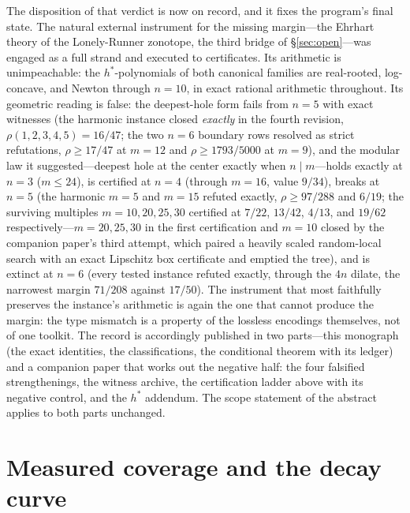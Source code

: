 \documentclass[11pt,a4paper]{article}
\numberwithin{equation}{section}
\theoremstyle{plain}
\theoremstyle{definition}
\theoremstyle{remark}
\begin{document}
The disposition of that verdict is now on record, and it fixes the
program's final state. The natural external instrument for the missing
margin---the Ehrhart theory of the Lonely-Runner zonotope, the third
bridge of \S\ref{sec:open}---was engaged as a full strand and executed
to certificates. Its arithmetic is unimpeachable: the $h^*$-polynomials
of both canonical families are real-rooted, log-concave, and Newton
through $n=10$, in exact rational arithmetic throughout. Its geometric
reading is false: the deepest-hole form fails from $n=5$ with exact
witnesses (the harmonic instance closed \emph{exactly} in the fourth
revision, $\rho(1,2,3,4,5)=16/47$; the two $n=6$ boundary rows
resolved as strict refutations, $\rho\ge17/47$ at $m=12$ and
$\rho\ge1793/5000$ at $m=9$),
and the modular law it suggested---deepest hole at the center exactly
when $n\mid m$---holds exactly at $n=3$ ($m\le 24$), is certified at
$n=4$ (through $m=16$, value $9/34$), breaks at $n=5$ (the harmonic
$m=5$ and $m=15$ refuted exactly, $\rho\ge 97/288$ and $6/19$; the
surviving multiples $m=10,20,25,30$ certified at $7/22$, $13/42$,
$4/13$, and $19/62$ respectively---$m=20,25,30$ in the first
certification and $m=10$ closed by the companion paper's
third attempt, which paired a heavily scaled random-local
search with an exact Lipschitz box certificate and emptied the tree),
and is
extinct at $n=6$ (every tested instance refuted exactly, through the
$4n$ dilate, the narrowest margin $71/208$ against $17/50$). The
instrument that most faithfully preserves the instance's arithmetic is
again the one that cannot produce the margin: the type mismatch is a
property of the lossless encodings themselves, not of one toolkit.
The record is accordingly published in two parts---this monograph (the
exact identities, the classifications, the conditional theorem with
its ledger) and a companion paper \cite{companion-paper} that works
out the negative half: the four falsified strengthenings, the witness
archive, the certification ladder above with its negative control, and
the $h^*$ addendum. The scope statement of the abstract applies to
both parts unchanged.


\section{Measured coverage and the decay curve}\label{sec:measure}
\end{document}
